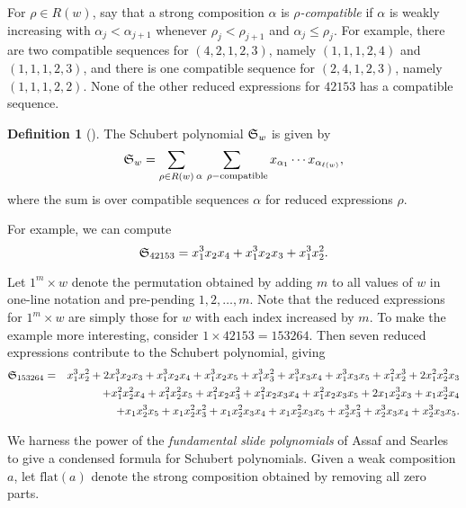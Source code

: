 \documentclass[11pt]{amsart}
\theoremstyle{definition}
\newtheorem{definition}[theorem]{Definition}
\theoremstyle{remark}
\numberwithin{equation}{section}
\newcommand{\schubert}{\ensuremath\mathfrak{S}}
\begin{document}
For $\rho \in R(w)$, say that a strong composition $\alpha$ is \emph{$\rho$-compatible} if $\alpha$ is weakly increasing with $\alpha_j < \alpha_{j+1}$ whenever $\rho_j < \rho_{j+1}$ and $\alpha_j \leq \rho_j$. For example, there are two compatible sequences for $(4,2,1,2,3)$, namely $(1,1,1,2,4)$ and $(1,1,1,2,3)$, and there is one compatible sequence for $(2,4,1,2,3)$, namely $(1,1,1,2,2)$. None of the other reduced expressions for $42153$ has a compatible sequence.

\begin{definition}[\cite{BJS93}]
  The Schubert polynomial $\schubert_w$ is given by
  \begin{equation}
    \schubert_w = \sum_{\rho \in R(w)} \sum_{\alpha \ \rho-\mathrm{compatible}} x_{\alpha_1} \cdots x_{\alpha_{\ell(w)}},
  \end{equation}
  where the sum is over compatible sequences $\alpha$ for reduced expressions $\rho$.
  \label{def:schubert}
\end{definition}

For example, we can compute
\begin{displaymath}
  \schubert_{42153} = x_1^3 x_2 x_4 + x_1^3 x_2 x_3 + x_1^3 x_2^2.
\end{displaymath}

Let $1^m \times w$ denote the permutation obtained by adding $m$ to all values of $w$ in one-line notation and pre-pending $1,2,\ldots,m$. Note that the reduced expressions for $1^m \times w$ are simply those for $w$ with each index increased by $m$. To make the example more interesting, consider $1 \times 42153 = 153264$. Then seven reduced expressions contribute to the Schubert polynomial, giving
\begin{eqnarray*}
  \schubert_{153264} & = & x_1^3 x_2^2+2 x_1^3 x_2 x_3+x_1^3 x_2 x_4+x_1^3 x_2 x_5+x_1^3 x_3^2+x_1^3 x_3 x_4+x_1^3 x_3 x_5+x_1^2 x_2^3+2 x_1^2 x_2^2 x_3 \\
  & & + x_1^2 x_2^2 x_4+x_1^2 x_2^2 x_5+x_1^2 x_2 x_3^2+x_1^2 x_2 x_3 x_4+x_1^2 x_2 x_3 x_5+2 x_1 x_2^3 x_3+x_1 x_2^3 x_4 \\
  & & +x_1 x_2^3 x_5 + x_1 x_2^2 x_3^2+x_1 x_2^2 x_3 x_4+x_1 x_2^2 x_3 x_5+x_2^3 x_3^2+x_2^3 x_3 x_4+x_2^3 x_3 x_5 .
\end{eqnarray*}

We harness the power of the \emph{fundamental slide polynomials} of Assaf and Searles \cite{AS17} to give a condensed formula for Schubert polynomials. Given a weak composition $a$, let $\mathrm{flat}(a)$ denote the strong composition obtained by removing all zero parts.
\end{document}
